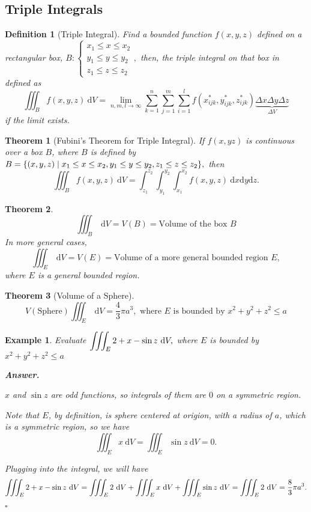 \documentclass[12pt,a4paper]{article}
\newtheorem{thm}{Theorem}[subsection]
\newtheorem{df}{Definition}[subsection]
\newtheorem{eg}{Example}[subsection]
\newenvironment*{ans}{\par\indent\textbf{\textit{Answer. }}\par}{\par\hfill{$\square$}\par}
\def\dsst{\displaystyle}
\def\d{{\mathrm{d}}}
\def\dx{\d x}
\def\iiintB{\dsst\iiint_B}
\def\iiintE{\dsst\iiint_E}
\begin{document}
\subsection{Triple Integrals}
\begin{df}[Triple Integral]
	Find a bounded function $f(x,y,z)$ defined on a rectangular box, $B:\begin{cases}x_1\leq x\leq x_2\\y_1\leq y\leq y_2\\ z_1\leq z\leq z_2\end{cases},$ then, the triple integral on that box in defined as \[\iiintB f(x,y,z)\ \d V=\lim_{n,m,l\to\infty}\sum_{k=1}^n\sum_{j=1}^m\sum_{i=1}^l f(x_{ijk}^*,y_{ijk}^*,z_{ijk}^*)\underbrace{\Delta x\Delta y\Delta z}_{\Delta V}\] if the limit exists. 
\end{df}
\begin{thm}[Fubini's Theorem for Triple Integral]
If $f(x,yz)$ is continuous over a box $B$, where $B$ is defined by $B=\qty{(x,y,z)\mid x_1\leq x\leq x_2, y_1\leq y\leq y_2, z_1\leq z\leq z_2},$ then 	
	\[\iiintB f(x,y,z)\ \d V=\int_{z_1}^{z_2}\int_{y_1}^{y_2}\int_{x_1}^{x_2}f(x,y,z)\ \dx\d y\d z.\]
\end{thm}
\begin{thm}
	\[\iiintB\ \d V=V(B)=\text{Volume of the box }B\] In more general cases, \[\iiintE\ \d V=V(E)=\text{Volume of a more general bounded region }E, \]where $E$ is a general bounded region. 
\end{thm}
\begin{thm}[Volume of a Sphere]
	\[V(\text{Sphere})\iiint_E\ \d V=\dfrac{4}{3}\pi a^3,\text{ where }E\text{ is bounded by } x^2+y^2+z^2\leq a\]	
\end{thm}
\begin{eg}
	Evaluate $\dsst\iiintE2+x-\sin{z}\ \d V,$ where $E$ is bounded by $x^2+y^2+z^2\leq a$
	\begin{ans}
		$x$ and $\sin{z}$ are	odd functions, so integrals of them are $0$ on a symmetric region.\par Note that $E$, by definition, is sphere centered at origion, with a radius of $a$, which is a symmetric region, so we have \[\iiintE x\ \d V=\iiintE\sin{z}\ \d V=0.\]\par Plugging into the integral, we will have\[\dsst\iiintE2+x-\sin{z}\ \d V=\iiintE2\ \d V+\iiintE x\ \d V+\iiintE\sin{z}\ \d V=\iiintE2\ \d V=\dfrac{8}{3}\pi a^3.\]
	\end{ans}
\end{eg}
\end{document}
